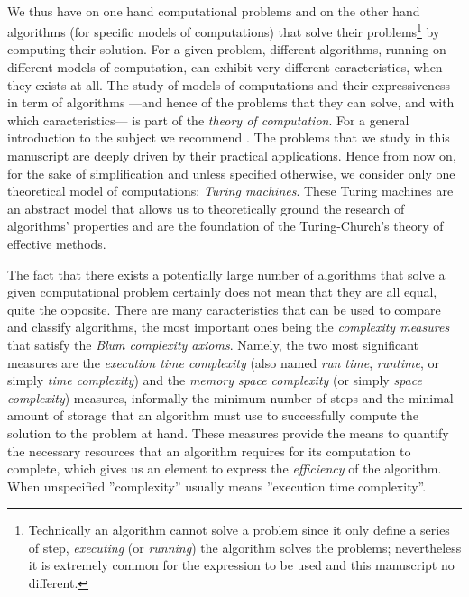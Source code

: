 	\paragraph{}
	We thus have on one hand computational problems and on the other hand algorithms (for specific models of computations) that solve their problems\footnote{Technically an algorithm cannot solve a problem since it only define a series of step, \emph{executing} (or \emph{running}) the algorithm solves the problems; nevertheless it is extremely common for the expression to be used and this manuscript no different.} by computing their solution.
	For a given problem, different algorithms, running on different models of computation, can exhibit very different caracteristics, when they exists at all.
	The study of models of computations and their expressiveness in term of algorithms ---and hence of the problems that they can solve, and with which caracteristics--- is part of the \emph{theory of computation}.
	For a general introduction to the subject we recommend \parencite{sipser2012introduction}.
	The problems that we study in this manuscript are deeply driven by their practical applications.
	Hence from now on, for the sake of simplification and unless specified otherwise, we consider only one theoretical model of computations: \emph{Turing machines}.
	These Turing machines are an abstract model that allows us to theoretically ground the research of algorithms' properties and are the foundation of the Turing-Church's theory of effective methods.

	The fact that there exists a potentially large number of algorithms %
	that solve a given computational problem certainly does not mean that they are all equal, quite the opposite.
	There are many caracteristics that can be used to compare and classify algorithms, the most important ones being the \emph{complexity measures} that satisfy the \emph{Blum complexity axioms}.
	Namely, the two most significant measures are the \emph{execution time complexity} (also named \emph{run time}, \emph{runtime}, or simply \emph{time complexity}) and the \emph{memory space complexity} (or simply \emph{space complexity}) measures, informally the minimum number of steps and the minimal amount of storage that an algorithm must use to successfully compute the solution to the problem at hand.
	These measures provide the means to quantify the necessary resources that an algorithm requires for its computation to complete, which gives us an element to express the \emph{efficiency} of the algorithm.
	When unspecified ''complexity'' usually means ''execution time complexity''.

